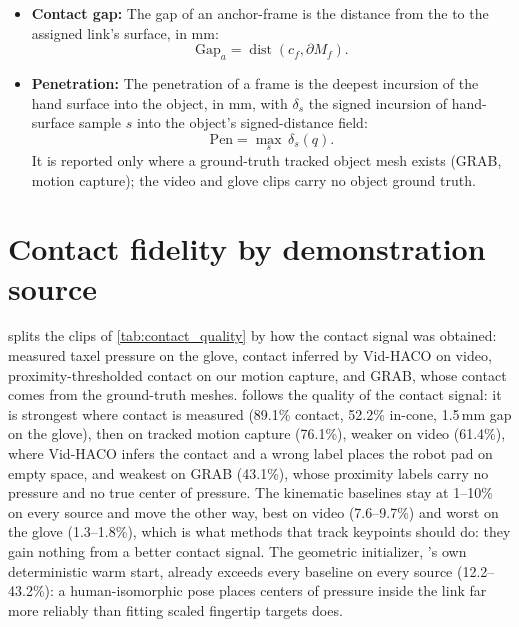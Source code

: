 \begin{itemize}
\begin{equation}
    \end{equation}
    \item \textbf{Contact gap:} The gap of an anchor-frame is the distance from the \fca to the assigned link's surface, in mm:
    \begin{equation}
    \mathrm{Gap}_a=\operatorname{dist}\!\left(c_f,\partial M_f\right).
    \end{equation}
    \item \textbf{Penetration:} The penetration of a frame is the deepest incursion of the hand surface into the object, in mm, with $\delta_s$ the signed incursion of hand-surface sample $s$ into the object's signed-distance field:
    \begin{equation}
    \mathrm{Pen}=\max_s\,\delta_s(q).
    \end{equation}
    It is reported only where a ground-truth tracked object mesh exists (GRAB, motion capture); the video and glove clips carry no object ground truth.
\end{itemize}

\section{Contact fidelity by demonstration source}
\label{app:by_source}

 splits the clips of \cref{tab:contact_quality} by how the contact signal was obtained: measured taxel pressure on the glove, contact inferred by Vid-HACO on video, proximity-thresholded contact on our motion capture, and GRAB, whose contact comes from the ground-truth meshes. \ours follows the quality of the contact signal: it is strongest where contact is measured (89.1\% contact, 52.2\% in-cone, 1.5\,mm gap on the glove), then on tracked motion capture (76.1\%), weaker on video (61.4\%), where Vid-HACO infers the contact and a wrong label places the robot pad on empty space, and weakest on GRAB (43.1\%), whose proximity labels carry no pressure and no true center of pressure. The kinematic baselines stay at 1--10\% on every source and move the other way, best on video (7.6--9.7\%) and worst on the glove (1.3--1.8\%), which is what methods that track keypoints should do: they gain nothing from a better contact signal. The geometric initializer, \ours's own deterministic warm start, already exceeds every baseline on every source (12.2--43.2\%): a human-isomorphic pose places centers of pressure inside the link far more reliably than fitting scaled fingertip targets does.

